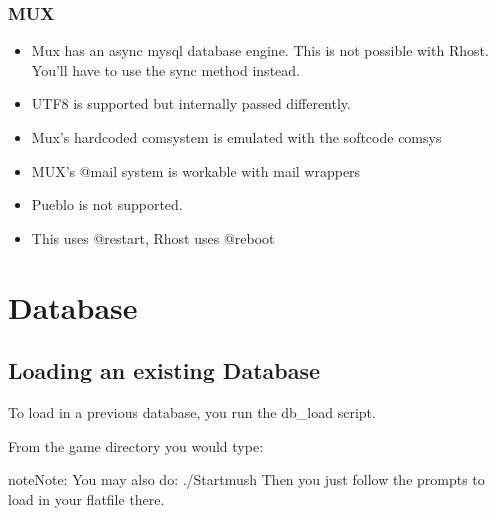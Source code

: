 \documentclass[letterpaper,10pt,english]{sphinxmanual}
\begin{document}
\subsection{MUX}
\label{\detokenize{differences:id3}}\begin{itemize}
\item {} 
\sphinxAtStartPar
Mux has an async mysql database engine.  This is not possible with Rhost.  You’ll have to use the sync method instead.

\item {} 
\sphinxAtStartPar
UTF8 is supported but internally passed differently.

\item {} 
\sphinxAtStartPar
Mux’s hardcoded comsystem is emulated with the softcode comsys

\item {} 
\sphinxAtStartPar
MUX’s @mail system is workable with mail wrappers

\item {} 
\sphinxAtStartPar
Pueblo is not supported.

\item {} 
\sphinxAtStartPar
This uses @restart, Rhost uses @reboot

\end{itemize}


\chapter{Database}
\label{\detokenize{database:database}}\label{\detokenize{database::doc}}

\section{Loading an existing Database}
\label{\detokenize{database:loading-an-existing-database}}
\sphinxAtStartPar
To load in a previous database, you run the db\_load script.

\sphinxAtStartPar
From the game directory you would type:

\begin{sphinxVerbatim}[commandchars=\\\{\}]
   
\end{sphinxVerbatim}

\begin{sphinxadmonition}{note}{Note:}
\sphinxAtStartPar
You may also do: ./Startmush
Then you just follow the prompts to load in your flatfile there.
\end{sphinxadmonition}
\end{document}
